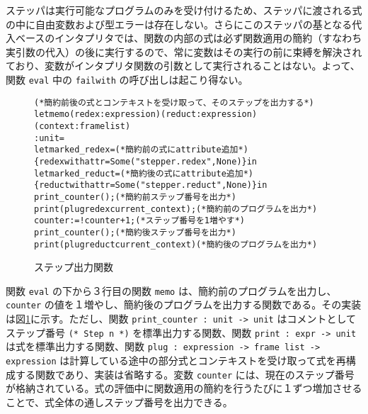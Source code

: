 ステッパは実行可能なプログラムのみを受け付けるため、ステッパに渡される式の中に自由変数および型エラーは存在しない。さらにこのステッパの基となる代入ベースのインタプリタでは、関数の内部の式は必ず関数適用の簡約（すなわち実引数の代入）の後に実行するので、常に変数はその実行の前に束縛を解決されており、変数がインタプリタ関数の引数として実行されることはない。よって、関数 \texttt{eval} 中の \texttt{failwith} の呼び出しは起こり得ない。

\begin{figure}[t]
\begin{spacing}{0.8}
\begin{alltt}
(* 簡約前後の式とコンテキストを受け取って、そのステップを出力する *)
let memo (redex : expression) (reduct : expression) (context : frame list)
  : unit =
  let marked\_redex =                            (* 簡約前の式に attribute 追加 *)
    \{redex with attr = Some ("stepper.redex", None)\} in
  let marked\_reduct =                           (* 簡約後の式に attribute 追加 *)
    \{reduct with attr = Some ("stepper.reduct", None)\} in
  print\_counter ();                                 (* 簡約前ステップ番号を出力 *)
  print (plug redex current\_context);               (* 簡約前のプログラムを出力 *)
  counter := !counter + 1;                          (* ステップ番号を 1 増やす *)
  print\_counter ();                                 (* 簡約後ステップ番号を出力 *)
  print (plug reduct current\_context)               (* 簡約後のプログラムを出力 *)
\end{alltt}
\end{spacing}
\caption{ステップ出力関数}
\label{figure:memo}
\end{figure}

関数 \texttt{eval} の下から３行目の関数 \texttt{memo} は、簡約前のプログラムを出力し、 \texttt{counter} の値を１増やし、簡約後のプログラムを出力する関数である。その実装は図\ref{figure:memo}に示す。ただし、関数 \texttt{print\_counter : unit -> unit} はコメントとしてステップ番号 \texttt{(* Step n *)} を標準出力する関数、関数 \texttt{print : expr -> unit} は式を標準出力する関数、関数 \texttt{plug : expression -> frame list -> expression} は計算している途中の部分式とコンテキストを受け取って式を再構成する関数であり、実装は省略する。変数 \texttt{counter} には、現在のステップ番号が格納されている。式の評価中に関数適用の簡約を行うたびに１ずつ増加させることで、式全体の通しステップ番号を出力できる。
